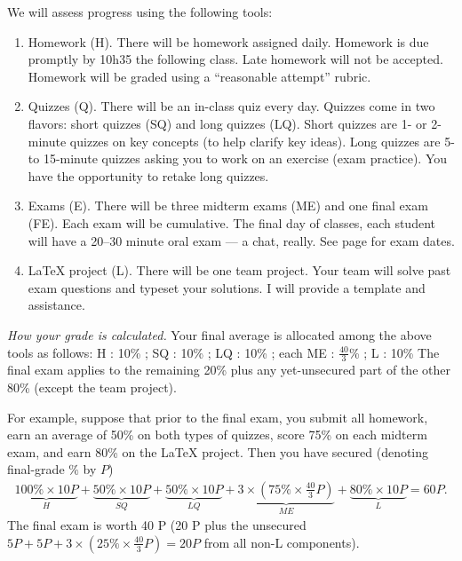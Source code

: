 We will assess progress using the following tools:
\begin{enumerate}
\item Homework (H). There will be homework assigned daily. Homework is due promptly by 10h35 the following class. Late homework will not be accepted. Homework will be graded using a ``reasonable attempt'' rubric.
\item Quizzes (Q). There will be an in-class quiz every day. Quizzes come in two flavors: short quizzes (SQ) and long quizzes (LQ). Short quizzes are 1- or 2-minute quizzes on key concepts (to help clarify key ideas). Long quizzes are 5- to 15-minute quizzes asking you to work on an exercise (exam practice). You have the opportunity to retake long quizzes.
\item Exams (E). There will be three midterm exams (ME) and one final exam (FE). Each exam will be cumulative. The final day of classes, each student will have a 20--30 minute oral exam --- a chat, really. See page \pageref{sec: Calendar} for exam dates.
\item \LaTeX{} project (L). There will be one team project. Your team will solve past exam questions and typeset your solutions. I will provide a template and assistance.
\end{enumerate}

\noindent{}\emph{How your grade is calculated.}
Your final average is allocated among the above tools as follows: H : 10\% ; SQ : 10\% ; LQ : 10\% ; each ME : $\frac{40}{3}$\% ; L : 10\%
The final exam applies to the remaining 20\% plus any yet-unsecured part of the other 80\% (except the team project).

For example, suppose that prior to the final exam, you submit all homework, earn an average of 50\% on both types of quizzes, score 75\% on each midterm exam, and earn 80\% on the \LaTeX{} project. Then you have secured (denoting final-grade $\%$ by $P$)
\begin{align*}
\underbrace{100\% \times 10 P}_{H} + \underbrace{50\% \times 10 P}_{SQ} + \underbrace{50\% \times 10 P}_{LQ} + \underbrace{3 \times \left(75\% \times \frac{40}{3} P\right)}_{ME} + \underbrace{80\% \times 10 P}_{L}
=
60 P.
\end{align*}
The final exam is worth 40 P (20 P plus the unsecured $5 P + 5 P + 3 \times (25\% \times \frac{40}{3} P) = 20 P$ from all non-L components).





